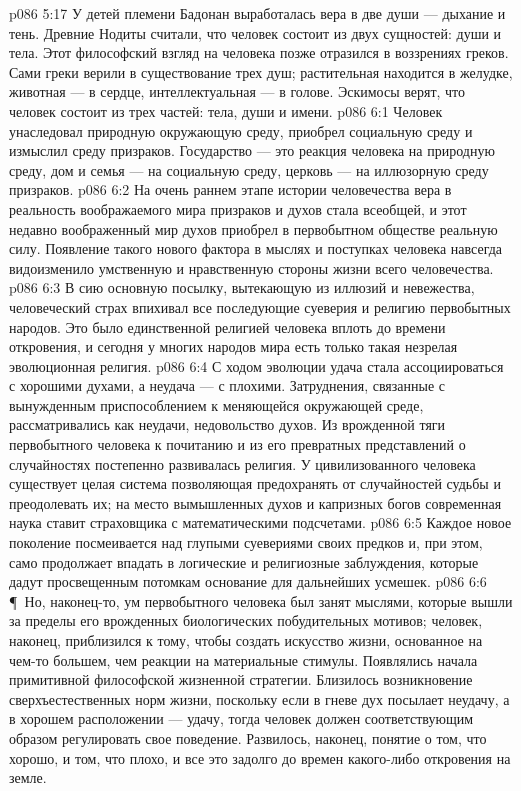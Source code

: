 \vs p086 5:17 У детей племени Бадонан выработалась вера в две души --- дыхание и тень. Древние Нодиты считали, что человек состоит из двух сущностей: души и тела. Этот философский взгляд на человека позже отразился в воззрениях греков. Сами греки верили в существование трех душ; растительная находится в желудке, животная --- в сердце, интеллектуальная --- в голове. Эскимосы верят, что человек состоит из трех частей: тела, души и имени.
\vs p086 6:1 Человек унаследовал природную окружающую среду, приобрел социальную среду и измыслил среду призраков. Государство --- это реакция человека на природную среду, дом и семья --- на социальную среду, церковь --- на иллюзорную среду призраков.
\vs p086 6:2 На очень раннем этапе истории человечества вера в реальность воображаемого мира призраков и духов стала всеобщей, и этот недавно воображенный мир духов приобрел в первобытном обществе реальную силу. Появление такого нового фактора в мыслях и поступках человека навсегда видоизменило умственную и нравственную стороны жизни всего человечества.
\vs p086 6:3 В сию основную посылку, вытекающую из иллюзий и невежества, человеческий страх впихивал все последующие суеверия и религию первобытных народов. Это было единственной религией человека вплоть до времени откровения, и сегодня у многих народов мира есть только такая незрелая эволюционная религия.
\vs p086 6:4 С ходом эволюции удача стала ассоциироваться с хорошими духами, а неудача --- с плохими. Затруднения, связанные с вынужденным приспособлением к меняющейся окружающей среде, рассматривались как неудачи, недовольство духов. Из врожденной тяги первобытного человека к почитанию и из его превратных представлений о случайностях постепенно развивалась религия. У цивилизованного человека существует целая система позволяющая предохранять от случайностей судьбы и преодолевать их; на место вымышленных духов и капризных богов современная наука ставит страховщика с математическими подсчетами.
\vs p086 6:5 Каждое новое поколение посмеивается над глупыми суевериями своих предков и, при этом, само продолжает впадать в логические и религиозные заблуждения, которые дадут просвещенным потомкам основание для дальнейших усмешек.
\vs p086 6:6 \P\ Но, наконец\hyp{}то, ум первобытного человека был занят мыслями, которые вышли за пределы его врожденных биологических побудительных мотивов; человек, наконец, приблизился к тому, чтобы создать искусство жизни, основанное на чем\hyp{}то большем, чем реакции на материальные стимулы. Появлялись начала примитивной философской жизненной стратегии. Близилось возникновение сверхъестественных норм жизни, поскольку если в гневе дух посылает неудачу, а в хорошем расположении --- удачу, тогда человек должен соответствующим образом регулировать свое поведение. Развилось, наконец, понятие о том, что хорошо, и том, что плохо, и все это задолго до времен какого\hyp{}либо откровения на земле.

